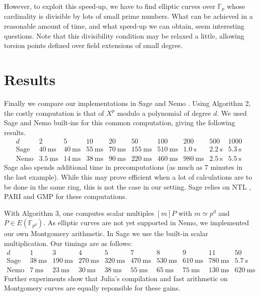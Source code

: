 \documentclass[12pt]{article}
\newcommand{\F}{\mathbb{F}}
\newcommand{\ms}{\mathrm{\ ms}}
\newcommand{\s}{\mathrm{\ s}}
\begin{document}
However, to exploit this speed-up, we have to find elliptic curves over $\F_p$ whose cardinality is divisible by lots of small prime numbers. What can be achieved in a reasonable amount of time, and what speed-up we can obtain, seem interesting questions. Note that this divisibility  condition may be relaxed a little, allowing torsion points defined over field extensions of small degree.

\section{Results}

Finally we compare our implementations in Sage \cite{Sage} and Nemo \cite{Nemo}. Using Algorithm 2, the costly computation is that of $X^p$ modulo a polynomial of degree $d$. We used Sage and Nemo built-ins for this common computation, giving the following results.
\[\begin{array}{c|c|c|c|c|c|c|c|c|c}
d & 2 & 5 & 10 & 20 & 50 & 100 & 200 & 500 & 1000\\
\hline
\text{Sage} & 40 \ms & 40 \ms & 55\ms & 70 \ms & 155\ms & 510\ms & 1.0 \s & 2.2 \s & 5.3 \s\\
\hline
\text{Nemo} & 3.5 \ms &  14 \ms & 38 \ms & 90 \ms & 220 \ms & 460 \ms & 980 \ms & 2.5 \s & 5.5 \s
\end{array}\]
Sage also spends additional time in precomputations (as much as 7 minutes in the last example). While this may prove efficient when a lot of calculations are to be done in the same ring, this is not the case in our setting. Sage relies on NTL \cite{NTL}, PARI \cite{Pari} and GMP \cite{GMP} for these computations.

With Algorithm 3, one computes scalar multiples $[m]P$ with $m\simeq p^d$ and $P\in E(\F_{p^d})$. As elliptic curves are not yet supported in Nemo, we implemented our own Montgomery arithmetic. In Sage we use the built-in scalar multiplication. Our timings are as follows:
$$\begin{array}{c|c|c|c|c|c|c|c|c|c}
d & 1 & 3 & 4 & 5 & 7 & 8 & 9 & 11 & 50\\
\hline
\text{Sage} & 38 \ms & 190 \ms & 270 \ms & 320 \ms & 470 \ms & 530 \ms & 610 \ms & 780 \ms & 5.7 \s\\
\hline
\text{Nemo} & 7 \ms & 23 \ms & 30 \ms & 38 \ms & 55 \ms & 65 \ms & 75 \ms & 130 \ms & 620\ms
\end{array}$$
Further experiments show that Julia's compilation and fast arithmetic on Montgomery curves are equally reponsible for these gains.
\end{document}
